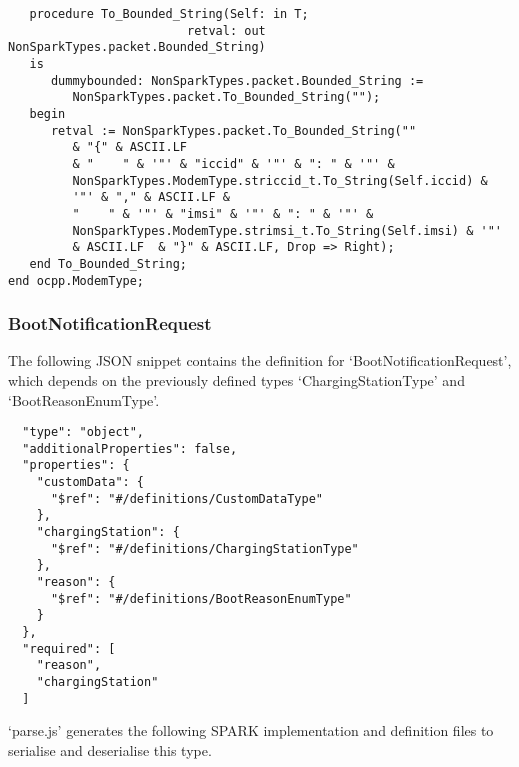 \documentclass[12pt,openany,a4paper]{book}
\begin{document}
\begin{verbatim}
   procedure To_Bounded_String(Self: in T;
                         retval: out NonSparkTypes.packet.Bounded_String)
   is
      dummybounded: NonSparkTypes.packet.Bounded_String := 
         NonSparkTypes.packet.To_Bounded_String(""); 
   begin
      retval := NonSparkTypes.packet.To_Bounded_String(""
         & "{" & ASCII.LF
         & "    " & '"' & "iccid" & '"' & ": " & '"' & 
         NonSparkTypes.ModemType.striccid_t.To_String(Self.iccid) & 
         '"' & "," & ASCII.LF & 
         "    " & '"' & "imsi" & '"' & ": " & '"' & 
         NonSparkTypes.ModemType.strimsi_t.To_String(Self.imsi) & '"' 
         & ASCII.LF  & "}" & ASCII.LF, Drop => Right);
   end To_Bounded_String;
end ocpp.ModemType;

\end{verbatim}




















\subsubsection{BootNotificationRequest}
The following JSON snippet contains the definition for `BootNotificationRequest', which depends on the previously defined types `ChargingStationType' and `BootReasonEnumType'.

\begin{verbatim}
  "type": "object",
  "additionalProperties": false,
  "properties": {
    "customData": {
      "$ref": "#/definitions/CustomDataType"
    },
    "chargingStation": {
      "$ref": "#/definitions/ChargingStationType"
    },
    "reason": {
      "$ref": "#/definitions/BootReasonEnumType"
    }
  },
  "required": [
    "reason",
    "chargingStation"
  ]
\end{verbatim}

`parse.js' generates the following SPARK implementation and definition files to serialise and deserialise this type.
\end{document}
